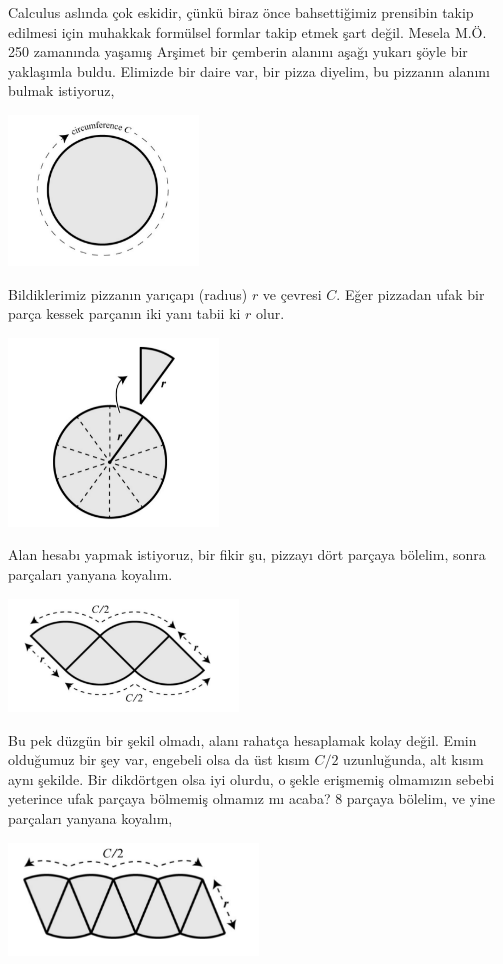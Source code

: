\documentclass[12pt,fleqn]{article}\usepackage{../../common}
\begin{document}
Calculus aslında çok eskidir, çünkü biraz önce bahsettiğimiz prensibin
takip edilmesi için muhakkak formülsel formlar takip etmek şart
değil. Mesela M.Ö. 250 zamanında yaşamış Arşimet bir çemberin alanını aşağı
yukarı şöyle bir yaklaşımla buldu. Elimizde bir daire var, bir pizza
diyelim, bu pizzanın alanını bulmak istiyoruz,

\includegraphics[height=4cm]{circ_1.png}

Bildiklerimiz pizzanın yarıçapı (radıus) $r$ ve çevresi $C$. Eğer pizzadan
ufak bir parça kessek parçanın iki yanı tabii ki $r$ olur.

\includegraphics[height=5cm]{circ_2.png}

Alan hesabı yapmak istiyoruz, bir fikir şu, pizzayı dört parçaya bölelim,
sonra parçaları yanyana koyalım.

\includegraphics[height=3cm]{circ_3.png}

Bu pek düzgün bir şekil olmadı, alanı rahatça hesaplamak kolay değil. Emin
olduğumuz bir şey var, engebeli olsa da üst kısım $C/2$ uzunluğunda, alt
kısım aynı şekilde. Bir dikdörtgen olsa iyi olurdu, o şekle erişmemiş
olmamızın sebebi yeterince ufak parçaya bölmemiş olmamız mı acaba? 8
parçaya bölelim, ve yine parçaları yanyana koyalım,

\includegraphics[height=3cm]{circ_4.png}
\end{document}
